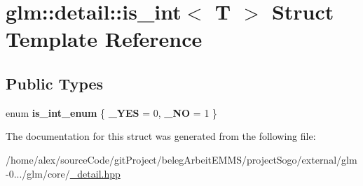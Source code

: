 \hypertarget{structglm_1_1detail_1_1is__int}{\section{glm\-:\-:detail\-:\-:is\-\_\-int$<$ T $>$ Struct Template Reference}
\label{structglm_1_1detail_1_1is__int}
}
\subsection*{Public Types}
\begin{DoxyCompactItemize}
\item 
enum {\bfseries is\-\_\-int\-\_\-enum} \{ {\bfseries \-\_\-\-Y\-E\-S} = 0, 
{\bfseries \-\_\-\-N\-O} = 1
 \}
\end{DoxyCompactItemize}


The documentation for this struct was generated from the following file\-:\begin{DoxyCompactItemize}
\item 
/home/alex/source\-Code/git\-Project/beleg\-Arbeit\-E\-M\-M\-S/project\-Sogo/external/glm-\/0.../glm/core/\hyperlink{__detail_8hpp}{\-\_\-detail.\-hpp}\end{DoxyCompactItemize}
